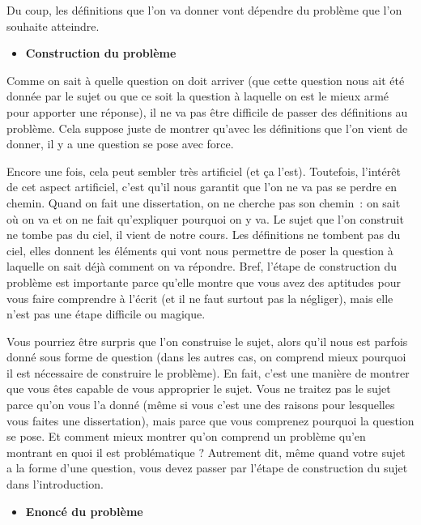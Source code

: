 \documentclass[
  letterpaper,
  DIV=11,
  numbers=noendperiod]{scrartcl}
\providecommand{\tightlist}{%
  \setlength{\itemsep}{0pt}\setlength{\parskip}{0pt}}\usepackage{longtable,booktabs,array}
\begin{document}
Du coup, les définitions que l'on va donner vont dépendre du problème
que l'on souhaite atteindre.

\begin{itemize}
\tightlist
\item
  \textbf{Construction du problème}
\end{itemize}

Comme on sait à quelle question on doit arriver (que cette question nous
ait été donnée par le sujet ou que ce soit la question à laquelle on est
le mieux armé pour apporter une réponse), il ne va pas être difficile de
passer des définitions au problème. Cela suppose juste de montrer
qu'avec les définitions que l'on vient de donner, il y a une question se
pose avec force.

Encore une fois, cela peut sembler très artificiel (et ça l'est).
Toutefois, l'intérêt de cet aspect artificiel, c'est qu'il nous garantit
que l'on ne va pas se perdre en chemin. Quand on fait une dissertation,
on ne cherche pas son chemin~: on sait où on va et on ne fait
qu'expliquer pourquoi on y va. Le sujet que l'on construit ne tombe pas
du ciel, il vient de notre cours. Les définitions ne tombent pas du
ciel, elles donnent les éléments qui vont nous permettre de poser la
question à laquelle on sait déjà comment on va répondre. Bref, l'étape
de construction du problème est importante parce qu'elle montre que vous
avez des aptitudes pour vous faire comprendre à l'écrit (et il ne faut
surtout pas la négliger), mais elle n'est pas une étape difficile ou
magique.

Vous pourriez être surpris que l'on construise le sujet, alors qu'il
nous est parfois donné sous forme de question (dans les autres cas, on
comprend mieux pourquoi il est nécessaire de construire le problème). En
fait, c'est une manière de montrer que vous êtes capable de vous
approprier le sujet. Vous ne traitez pas le sujet parce qu'on vous l'a
donné (même si vous c'est une des raisons pour lesquelles vous faites
une dissertation), mais parce que vous comprenez pourquoi la question se
pose. Et comment mieux montrer qu'on comprend un problème qu'en montrant
en quoi il est problématique ? Autrement dit, même quand votre sujet a
la forme d'une question, vous devez passer par l'étape de construction
du sujet dans l'introduction.

\begin{itemize}
\tightlist
\item
  \textbf{Enoncé du problème}
\end{itemize}
\end{document}
